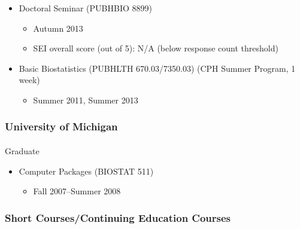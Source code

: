 \documentclass[
  english,
  letterpaper,
  DIV=11,
  numbers=noendperiod]{scrartcl}
\makeatletter
\let\oldparagraph\paragraph
\renewcommand{\paragraph}{
    \@ifstar
      \xxxParagraphStar
      \xxxParagraphNoStar
  }
\newcommand{\xxxParagraphStar}[1]{\oldparagraph*{#1}\mbox{}}
\newcommand{\xxxParagraphNoStar}[1]{\oldparagraph{#1}\mbox{}}
\providecommand{\tightlist}{%
  \setlength{\itemsep}{0pt}\setlength{\parskip}{0pt}}
\makeatother
\begin{document}
\begin{itemize}
  \begin{itemize}
  \tightlist
  \item
    Autumn 2019, Autumn 2023, Autumn 2025
  \item
    SEI overall score (out of 5): 5.0, 5.0
  \item
    Survey of the Student Learning Experience (SSLE) mean score range
    (out of 5): 4.9-4.9 (AU25)
  \end{itemize}
\item
  Doctoral Seminar (PUBHBIO 8899)

  \begin{itemize}
  \tightlist
  \item
    Autumn 2013
  \item
    SEI overall score (out of 5): N/A (below response count threshold)
  \end{itemize}
\item
  Basic Biostatistics (PUBHLTH 670.03/7350.03) (CPH Summer Program, 1
  week)

  \begin{itemize}
  \tightlist
  \item
    Summer 2011, Summer 2013
  \end{itemize}
\end{itemize}

\subsubsection{University of Michigan}\label{university-of-michigan}

\paragraph{Graduate}\label{graduate-1}

\begin{itemize}
\tightlist
\item
  Computer Packages (BIOSTAT 511)

  \begin{itemize}
  \tightlist
  \item
    Fall 2007--Summer 2008
  \end{itemize}
\end{itemize}

\subsubsection{Short Courses/Continuing Education
Courses}\label{short-coursescontinuing-education-courses}
\end{document}
